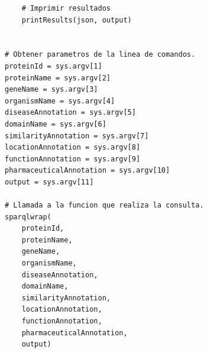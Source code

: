 \documentclass[12pt]{article}
\begin{document}
\begin{Verbatim}
    # Imprimir resultados
    printResults(json, output)


# Obtener parametros de la linea de comandos.
proteinId = sys.argv[1]
proteinName = sys.argv[2]
geneName = sys.argv[3]
organismName = sys.argv[4]
diseaseAnnotation = sys.argv[5]
domainName = sys.argv[6]
similarityAnnotation = sys.argv[7]
locationAnnotation = sys.argv[8]
functionAnnotation = sys.argv[9]
pharmaceuticalAnnotation = sys.argv[10]
output = sys.argv[11]

# Llamada a la funcion que realiza la consulta.
sparqlwrap(
    proteinId,
    proteinName,
    geneName,
    organismName,
    diseaseAnnotation,
    domainName,
    similarityAnnotation,
    locationAnnotation,
    functionAnnotation,
    pharmaceuticalAnnotation,
    output)
\end{Verbatim}

\pagebreak
\end{document}

